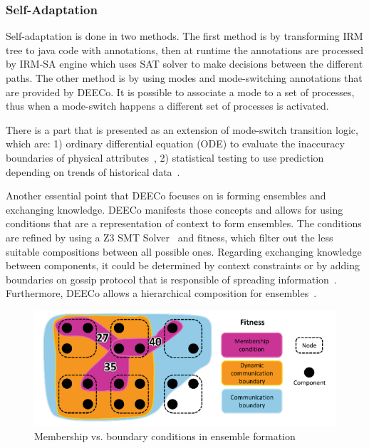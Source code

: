  
\subsubsection{Self-Adaptation}
Self-adaptation is done in two methods. The first method is by transforming IRM tree to java code with annotations, then at runtime the annotations are processed by IRM-SA engine which uses SAT solver to make decisions between the different paths. The other method is by using modes and mode-switching annotations that are provided by DEECo. It is possible to associate a mode to a set of processes, thus when a mode-switch happens a different set of processes is activated.

There is a part that is presented as an extension of mode-switch transition logic, which are: 1) ordinary differential equation (ODE) to evaluate the inaccuracy boundaries of physical attributes~\cite{10.1109/WICSA.2014.20}, 2) statistical testing to use prediction depending on trends of historical data~\cite{7516826}.

Another essential point that DEECo focuses on is forming ensembles and exchanging knowledge. DEECo manifests those concepts and allows for using conditions that are a representation of context to form ensembles. The conditions are refined by using a Z3 SMT Solver~\cite{Krijt2017Intelligent} and fitness, which filter out the less suitable compositions between all possible ones. Regarding exchanging knowledge between components, it could be determined by context constraints or by adding boundaries on gossip protocol that is responsible of spreading information~\cite{Bures2014}. Furthermore, DEECo allows a hierarchical composition for ensembles~\cite{Bures:2015:TIE:2797433.2797450}\cite{Bures2016}.

\begin{figure}[!htb]
\centering
\includegraphics[scale=0.60]{figures/fitness}
\caption{Membership vs. boundary conditions in ensemble formation}
\label{fig:fitness}
\end{figure}

